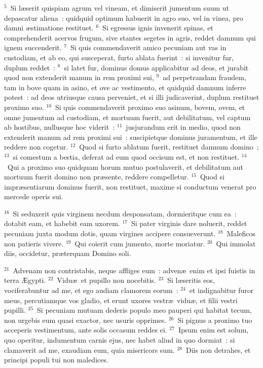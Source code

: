 ${}^{5}$~Si l\ae serit quispiam agrum vel vineam, et dimiserit jumentum suum ut depascatur aliena~: quidquid optimum habuerit in agro suo, vel in vinea, pro damni \ae stimatione restituet.
${}^{6}$~Si egressus ignis invenerit spinas, et comprehenderit acervos frugum, sive stantes segetes in agris, reddet damnum qui ignem succenderit.
${}^{7}$~Si quis commendaverit amico pecuniam aut vas in custodiam, et ab eo, qui susceperat, furto ablata fuerint~: si invenitur fur, duplum reddet~:
${}^{8}$~si latet fur, dominus domus applicabitur ad deos, et jurabit quod non extenderit manum in rem proximi sui,
${}^{9}$~ad perpetrandam fraudem, tam in bove quam in asino, et ove ac vestimento, et quidquid damnum inferre potest~: ad deos utriusque causa perveniet, et si illi judicaverint, duplum restituet proximo suo.
${}^{10}$~Si quis commendaverit proximo suo asinum, bovem, ovem, et omne jumentum ad custodiam, et mortuum fuerit, aut debilitatum, vel captum ab hostibus, nullusque hoc viderit~:
${}^{11}$~jusjurandum erit in medio, quod non extenderit manum ad rem proximi sui~: suscipietque dominus juramentum, et ille reddere non cogetur.
${}^{12}$~Quod si furto ablatum fuerit, restituet damnum domino~;
${}^{13}$~si comestum a bestia, deferat ad eum quod occisum est, et non restituet.
${}^{14}$~Qui a proximo suo quidquam horum mutuo postulaverit, et debilitatum aut mortuum fuerit domino non pr\ae sente, reddere compelletur.
${}^{15}$~Quod si impr\ae sentiarum dominus fuerit, non restituet, maxime si conductum venerat pro mercede operis sui.


${}^{16}$~Si seduxerit quis virginem necdum desponsatam, dormieritque cum ea~: dotabit eam, et habebit eam uxorem.
${}^{17}$~Si pater virginis dare noluerit, reddet pecuniam juxta modum dotis, quam virgines accipere consueverunt.
${}^{18}$~Maleficos non patieris vivere.
${}^{19}$~Qui coierit cum jumento, morte moriatur.
${}^{20}$~Qui immolat diis, occidetur, pr\ae terquam Domino soli.


${}^{21}$~Advenam non contristabis, neque affliges eum~: adven\ae\ enim et ipsi fuistis in terra \AE gypti.
${}^{22}$~Vidu\ae\ et pupillo non nocebitis.
${}^{23}$~Si l\ae seritis eos, vociferabuntur ad me, et ego audiam clamorem eorum~:
${}^{24}$~et indignabitur furor meus, percutiamque vos gladio, et erunt uxores vestr\ae\ vidu\ae , et filii vestri pupilli.
${}^{25}$~Si pecuniam mutuam dederis populo meo pauperi qui habitat tecum, non urgebis eum quasi exactor, nec usuris opprimes.
${}^{26}$~Si pignus a proximo tuo acceperis vestimentum, ante solis occasum reddes ei.
${}^{27}$~Ipsum enim est solum, quo operitur, indumentum carnis ejus, nec habet aliud in quo dormiat~: si clamaverit ad me, exaudiam eum, quia misericors sum.
${}^{28}$~Diis non detrahes, et principi populi tui non maledices.


